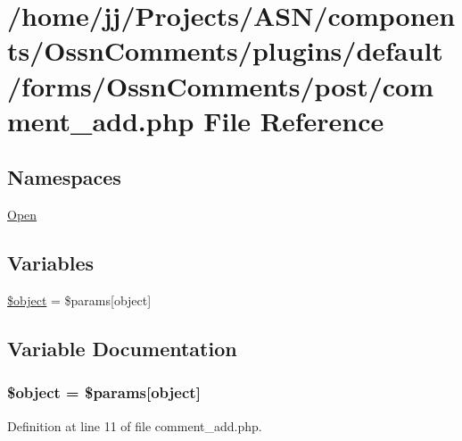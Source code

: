 \hypertarget{post_2comment__add_8php}{}\section{/home/jj/\+Projects/\+A\+S\+N/components/\+Ossn\+Comments/plugins/default/forms/\+Ossn\+Comments/post/comment\+\_\+add.php File Reference}
\label{post_2comment__add_8php}
\subsection*{Namespaces}
\begin{DoxyCompactItemize}
\item 
 \hyperlink{namespace_open}{Open}
\end{DoxyCompactItemize}
\subsection*{Variables}
\begin{DoxyCompactItemize}
\item 
\hyperlink{post_2comment__add_8php_a52123b83a1952a68c5513e47d59ec4a6}{\$object} = \$params\mbox{[}\textquotesingle{}object\textquotesingle{}\mbox{]}
\end{DoxyCompactItemize}


\subsection{Variable Documentation}
\subsubsection[{\texorpdfstring{\$object}{$object}}]{\setlength{\rightskip}{0pt plus 5cm}\$object = \$params\mbox{[}\textquotesingle{}object\textquotesingle{}\mbox{]}}\hypertarget{post_2comment__add_8php_a52123b83a1952a68c5513e47d59ec4a6}{}\label{post_2comment__add_8php_a52123b83a1952a68c5513e47d59ec4a6}


Definition at line 11 of file comment\+\_\+add.\+php.

